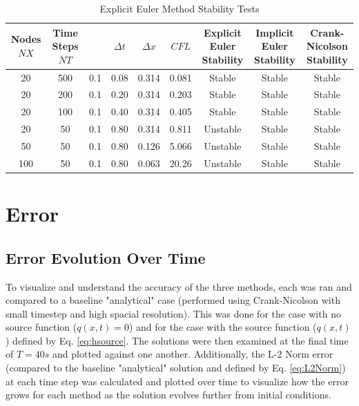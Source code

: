 \documentclass[10pt, letter, showtrims]{extarticle}
\begin{document}
		\FloatBarrier
		\begin{table}[h]
			\caption{Explicit Euler Method Stability Tests}
			\centering
			\begin{tabular}{|c|c|c|c|c|c|c|c|c|}
				\hline
				\makecell{Nodes \\ $NX$} & \makecell{Time Steps \\ $NT$} & \makecell{$K$} & $\Delta t$ & $\Delta x$ & $CFL$ & \makecell{Explicit Euler \\ Stability} & \makecell{Implicit Euler \\ Stability} & \makecell{Crank-Nicolson \\ Stability} \\
				\hline \rowcolor{Gray} 
				20  & 500 & 0.1 & 0.08 & 0.314 & 0.081 & Stable & Stable & Stable  \\
				\hline
				20  & 200 & 0.1 & 0.20 & 0.314 & 0.203 & Stable & Stable & Stable  \\
				\hline \rowcolor{Gray} 
				20  & 100 & 0.1 & 0.40 & 0.314 & 0.405 & Stable & Stable & Stable  \\
				\hline
				20  & 50  & 0.1 & 0.80 & 0.314 & 0.811 & Unstable & Stable & Stable \\
				\hline \rowcolor{Gray}
				50  & 50  & 0.1 & 0.80 & 0.126 & 5.066 & Unstable & Stable & Stable \\
				\hline
				100 & 50  & 0.1 & 0.80 & 0.063 & 20.26 & Unstable & Stable & Stable \\
				\hline
			\end{tabular}
		\end{table}
		\FloatBarrier
		
		\section{Error}
		
		\subsection{Error Evolution Over Time}

		\noindent
		To visualize and understand the accuracy of the three methods, each was ran and compared to a baseline "analytical" case (performed using Crank-Nicolson with small timestep and high spacial resolution). This was done for the case with no source function ($q(x,t) = 0$) and for the case with the source function ($q(x, t)$) defined by Eq. \ref{eq:hsource}. The solutions were then examined at the final time of $T = 40 s$ and plotted against one another. Additionally, the L-2 Norm error (compared to the baseline "analytical" solution and defined by Eq. \ref{eq:L2Norm}) at each time step was calculated and plotted over time to visualize how the error grows for each method as the solution evolves further from initial conditions.		
		
\end{document}
